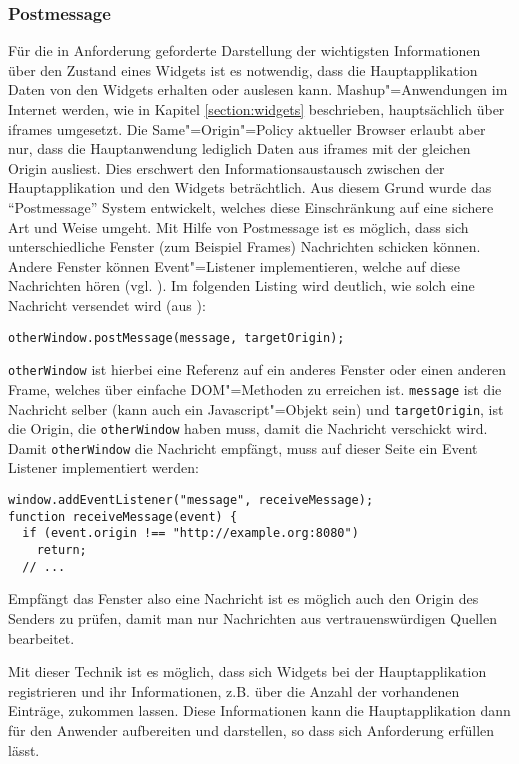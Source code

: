 \subsubsection*{Postmessage}
Für die in Anforderung  geforderte Darstellung der wichtigsten Informationen über den Zustand eines Widgets ist es notwendig, dass die Hauptapplikation Daten von den Widgets erhalten oder auslesen kann. Mashup"=Anwendungen im Internet werden, wie in Kapitel \ref{section:widgets} beschrieben, hauptsächlich über iframes umgesetzt. Die Same"=Origin"=Policy aktueller Browser erlaubt aber nur, dass die Hauptanwendung lediglich Daten aus iframes mit der gleichen Origin ausliest. Dies erschwert den Informationsaustausch zwischen der Hauptapplikation und den Widgets beträchtlich. Aus diesem Grund wurde das "`Postmessage"' System entwickelt, welches diese Einschränkung auf eine sichere Art und Weise umgeht. Mit Hilfe von Postmessage ist es möglich, dass sich unterschiedliche Fenster (zum Beispiel Frames) Nachrichten schicken können. Andere Fenster können Event"=Listener implementieren, welche auf diese Nachrichten hören (vgl. \cite{MDN2012}). Im folgenden Listing wird deutlich, wie solch eine Nachricht versendet wird (aus \cite{MDN2012}):
\begin{lstlisting}
otherWindow.postMessage(message, targetOrigin);
\end{lstlisting}
\texttt{otherWindow} ist hierbei eine Referenz auf ein anderes Fenster oder einen anderen Frame, welches über einfache \ac{DOM}"=Methoden zu erreichen ist. \texttt{message} ist die Nachricht selber (kann auch ein Javascript"=Objekt sein) und \texttt{target\allowbreak Origin}, ist die Origin, die \texttt{otherWindow} haben muss, damit die Nachricht verschickt wird. Damit \texttt{otherWindow} die Nachricht empfängt, muss auf dieser Seite ein Event Listener implementiert werden:
\begin{lstlisting}
window.addEventListener("message", receiveMessage);
function receiveMessage(event) {
  if (event.origin !== "http://example.org:8080")
    return;
  // ...
\end{lstlisting}
Empfängt das Fenster also eine Nachricht ist es möglich auch den Origin des Senders zu prüfen, damit man nur Nachrichten aus vertrauenswürdigen Quellen bearbeitet.

Mit dieser Technik ist es möglich, dass sich Widgets bei der Hauptapplikation registrieren und ihr Informationen, z.B. über die Anzahl der vorhandenen Einträge, zukommen lassen. Diese Informationen kann die Hauptapplikation dann für den Anwender aufbereiten und darstellen, so dass sich Anforderung  erfüllen lässt.

